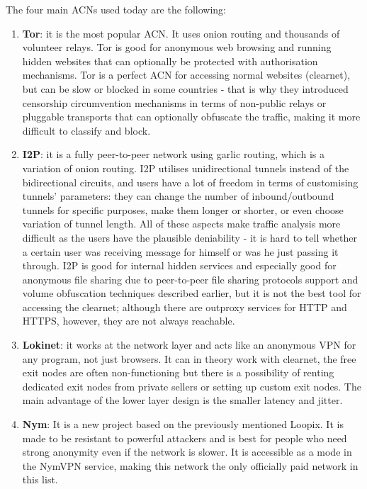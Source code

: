 The four main ACNs used today are the following:
\begin{enumerate}
    \item \textbf{Tor}: it is the most popular ACN. It uses onion routing and thousands of volunteer relays. Tor is good for anonymous web browsing and running hidden websites that can optionally be protected with authorisation mechanisms. Tor is a perfect ACN for accessing normal websites (clearnet), but can be slow or blocked in some countries - that is why they introduced censorship circumvention mechanisms in terms of non-public relays or pluggable transports that can optionally obfuscate the traffic, making it more difficult to classify and block.
    \item \textbf{I2P}: it is a fully peer-to-peer network using garlic routing, which is a variation of onion routing. I2P utilises unidirectional tunnels instead of the bidirectional circuits, and users have a lot of freedom in terms of customising tunnels' parameters: they can change the number of inbound/outbound tunnels for specific purposes, make them longer or shorter, or even choose variation of tunnel length. All of these aspects make traffic analysis more difficult as the users have the plausible deniability - it is hard to tell whether a certain user was receiving message for himself or was he just passing it through. I2P is good for internal hidden services and especially good for anonymous file sharing due to peer-to-peer file sharing protocols support and volume obfuscation techniques described earlier, but it is not the best tool for accessing the clearnet; although there are outproxy services for HTTP and HTTPS, however, they are not always reachable.
    \item \textbf{Lokinet}: it works at the network layer and acts like an anonymous VPN for any program, not just browsers. It can in theory work with clearnet, the free exit nodes are often non-functioning but there is a possibility of renting dedicated exit nodes from private sellers or setting up custom exit nodes. The main advantage of the lower layer design is the smaller latency and jitter.
    \item \textbf{Nym}: It is a new project based on the previously mentioned Loopix. It is made to be resistant to powerful attackers and is best for people who need strong anonymity even if the network is slower. It is accessible as a mode in the NymVPN service, making this network the only officially paid network in this list.
\end{enumerate}

